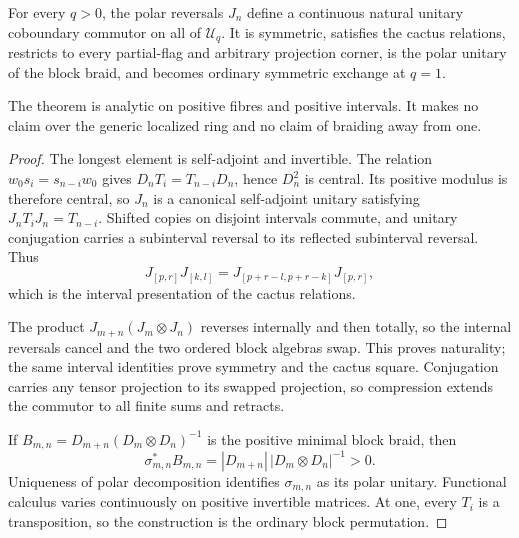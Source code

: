 \begin{theorem}
{\normalfont\statusProved}\quad For every $q>0$, the polar reversals $J_n$
define a continuous natural unitary coboundary commutor on all of
$\mathcal U_q$.  It is symmetric, satisfies the cactus relations, restricts
to every partial-flag and arbitrary projection corner, is the polar unitary
of the block braid, and becomes ordinary symmetric exchange at $q=1$.
\end{theorem}
\begin{scope}
The theorem is analytic on positive fibres and positive intervals.  It makes
no claim over the generic localized ring and no claim of braiding away from
one.
\end{scope}
\begin{proof}
The longest element is self-adjoint and invertible.  The relation
$w_0s_i=s_{n-i}w_0$ gives
$D_nT_i=T_{n-i}D_n$, hence $D_n^2$ is central.  Its positive modulus is
therefore central, so $J_n$ is a canonical self-adjoint unitary satisfying
$J_nT_iJ_n=T_{n-i}$.  Shifted copies on disjoint intervals commute, and
unitary conjugation carries a subinterval reversal to its reflected
subinterval reversal.  Thus
\[
 J_{[p,r]}J_{[k,l]}
 =J_{[p+r-l,p+r-k]}J_{[p,r]},
\]
which is the interval presentation of the cactus relations.

The product $J_{m+n}(J_m\otimes J_n)$ reverses internally and then totally,
so the internal reversals cancel and the two ordered block algebras swap.
This proves naturality; the same interval identities prove symmetry and the
cactus square.  Conjugation carries any tensor projection to its swapped
projection, so compression extends the commutor to all finite sums and
retracts.

If $B_{m,n}=D_{m+n}(D_m\otimes D_n)^{-1}$ is the positive minimal block
braid, then
\[
 \sigma_{m,n}^*B_{m,n}=|D_{m+n}|\,|D_m\otimes D_n|^{-1}>0.
\]
Uniqueness of polar decomposition identifies $\sigma_{m,n}$ as its polar
unitary.  Functional calculus varies continuously on positive invertible
matrices.  At one, every $T_i$ is a transposition, so the construction is the
ordinary block permutation.
\end{proof}
